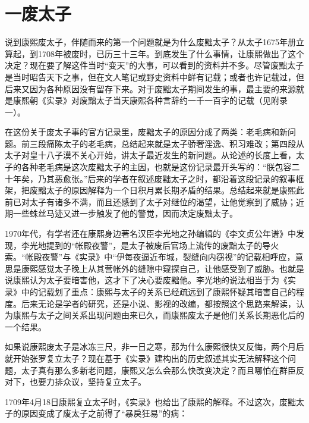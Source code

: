 \chapter{一废太子}

说到康熙废太子，伴随而来的第一个问题就是为什么废黜太子？从太子1675年册立算起，到1708年被废时，已历三十三年。到底发生了什么事情，让康熙做出了这个决定？现在要了解这件当时“变天”的大事，可以看到的资料并不多。尽管废黜太子是当时昭告天下之事，但在文人笔记或野史资料中鲜有记载；或者也许记载过，但后来又因为各种原因没有留存下来。对于废黜太子期间发生的事，最主要的来源就是康熙朝《实录》对废黜太子当天康熙各种言辞约一千一百字的记载（见附录一）。



在这份关于废太子事的官方记录里，废黜太子的原因分成了两类：老毛病和新问题。前三段痛陈太子的老毛病，总结起来就是太子骄奢淫逸、积习难改；第四段从太子对皇十八子漠不关心开始，讲太子最近发生的新问题。从论述的长度上看，太子的各种老毛病是这次废黜太子的主因，也就是这份记录最开头写的：“朕包容二十年矣，乃其恶愈张。”后来的学者在叙述废黜太子之时，都沿着这段记录的叙事框架，把废黜太子的原因解释为一个日积月累长期矛盾的结果。总结起来就是康熙此前已对太子有诸多不满，而且还感到了太子对继位的渴望，让他觉察到了威胁；近期一些蛛丝马迹又进一步触发了他的警觉，因而决定废黜太子。



1970年代，有学者还在康熙身边著名汉臣李光地之孙编辑的《李文贞公年谱》中发现，李光地提到的“帐殿夜警”，是太子被废后官场上流传的废黜太子的导火索。“帐殿夜警”与《实录》中“伊每夜逼近布城，裂缝向内窃视”的记载相呼应，意思是康熙感觉太子晚上从其营帐外的缝隙中窥探自己，让他感受到了威胁。也就是说康熙认为太子要暗害他，这才下了决心要废黜他。李光地的说法相当于为《实录》中的记载划了重点：康熙与太子的关系已经疏远到了康熙怀疑其暗害自己的程度。后来无论是学者的研究，还是小说、影视的改编，都按照这个思路来解读，认为康熙与太子之间关系出现问题由来已久，而康熙废太子是他们关系长期恶化后的一个结果。



如果说康熙废太子是冰冻三尺，非一日之寒，那为什么康熙很快又反悔，两个月后就开始张罗复立太子？现在基于《实录》建构出的历史叙述其实无法解释这个问题，太子真有那么多新老问题，康熙又怎么会那么快改变决定？而且哪怕在群臣反对下，也要力排众议，坚持复立太子。



1709年4月18日康熙复立太子时，《实录》也给出了康熙的解释。不过这次，废黜太子的原因变成了废太子之前得了“暴戾狂易”的病：


